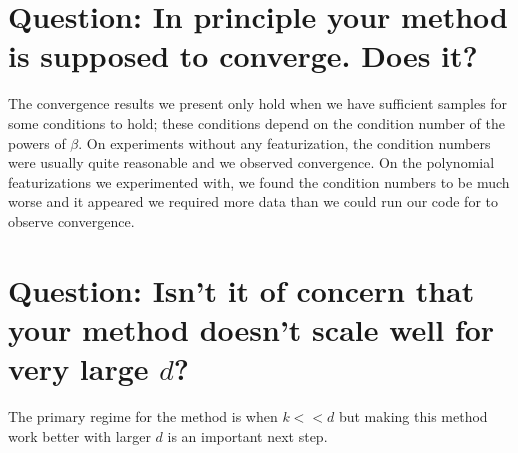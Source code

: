 \documentclass[tablecaption=bottom]{jmlr}
\begin{document}
\section{Question: In principle your method is supposed to converge.
Does it?}

The convergence results we present only hold when we have sufficient
samples for some conditions to hold; these conditions depend on the
condition number of the powers of $\beta$. On experiments without any
featurization, the condition numbers were usually quite reasonable and
we observed convergence. On the polynomial featurizations we
experimented with, we found the condition numbers to be much worse and
it appeared we required more data than we could run our code for to
observe convergence.

\section{Question: Isn't it of concern that your method doesn't scale
well for very large $d$?}

The primary regime for the method is when $k << d$ but making this
method work better with larger $d$ is an important next step.
\end{document}
